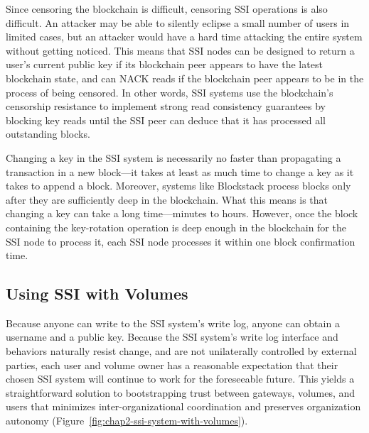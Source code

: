 Since censoring the blockchain is difficult, censoring SSI
operations is also difficult.  An attacker may be able to silently eclipse a small number
of users in limited cases, but an attacker would have a hard time attacking the
entire system without getting noticed.  This means that SSI nodes can be
designed to return a user's current public key if its blockchain peer appears to
have the latest blockchain state, and can NACK reads if the blockchain peer appears to be
in the process of being censored.  In other words, SSI systems use the
blockchain's censorship resistance to implement strong read consistency guarantees
by blocking key reads until the SSI peer can deduce that it has processed all
outstanding blocks.

Changing a key in the SSI system is necessarily no faster than propagating a
transaction in a new block---it takes at least as much time to change a key
as it takes to append a block.  Moreover, systems like Blockstack process blocks only after
they are sufficiently deep in the blockchain.  What this means is that changing
a key can take a long time---minutes to hours.  However, once the block
containing the key-rotation operation is deep enough in the blockchain for the
SSI node to process it, each SSI node processes it within one block confirmation
time.

\subsection{Using SSI with Volumes}

Because anyone can write to the SSI system's write log, anyone can obtain a
username and a public key.  Because the SSI system's write log interface and
behaviors naturally resist change, and are not unilaterally controlled by
external parties, each user and volume owner has a reasonable
expectation that their chosen SSI system will continue to work for the
foreseeable future.  This yields a straightforward solution to bootstrapping
trust between gateways, volumes, and users that minimizes inter-organizational
coordination and preserves organization autonomy 
(Figure~\ref{fig:chap2-ssi-system-with-volumes}).

